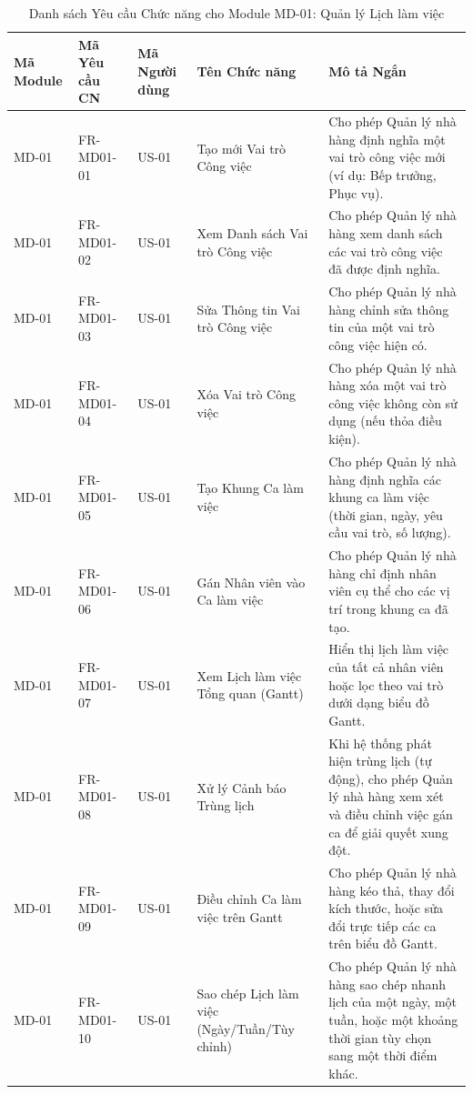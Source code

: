 \begin{longtable}{|m{2cm}|m{2.5cm}|m{2cm}|m{4cm}|m{4.5cm}|}
    \caption{Danh sách Yêu cầu Chức năng cho Module MD-01: Quản lý Lịch làm việc} \label{tab:fr_md01_revised} \\
    \hline
    \textbf{Mã Module} & \textbf{Mã Yêu cầu CN} & \textbf{Mã Người dùng} & \textbf{Tên Chức năng} & \textbf{Mô tả Ngắn} \\
    \hline
    \endhead
    
    \hline
    \endfoot
    
    \hline
    \endlastfoot
    
    MD-01 & FR-MD01-01 & US-01 & Tạo mới Vai trò Công việc & Cho phép Quản lý nhà hàng định nghĩa một vai trò công việc mới (ví dụ: Bếp trưởng, Phục vụ). \\
    \hline
    MD-01 & FR-MD01-02 & US-01 & Xem Danh sách Vai trò Công việc & Cho phép Quản lý nhà hàng xem danh sách các vai trò công việc đã được định nghĩa. \\
    \hline
    MD-01 & FR-MD01-03 & US-01 & Sửa Thông tin Vai trò Công việc & Cho phép Quản lý nhà hàng chỉnh sửa thông tin của một vai trò công việc hiện có. \\
    \hline
    MD-01 & FR-MD01-04 & US-01 & Xóa Vai trò Công việc & Cho phép Quản lý nhà hàng xóa một vai trò công việc không còn sử dụng (nếu thỏa điều kiện). \\
    \hline
    MD-01 & FR-MD01-05 & US-01 & Tạo Khung Ca làm việc & Cho phép Quản lý nhà hàng định nghĩa các khung ca làm việc (thời gian, ngày, yêu cầu vai trò, số lượng). \\
    \hline
    MD-01 & FR-MD01-06 & US-01 & Gán Nhân viên vào Ca làm việc & Cho phép Quản lý nhà hàng chỉ định nhân viên cụ thể cho các vị trí trong khung ca đã tạo. \\
    \hline
    MD-01 & FR-MD01-07 & US-01 & Xem Lịch làm việc Tổng quan (Gantt) & Hiển thị lịch làm việc của tất cả nhân viên hoặc lọc theo vai trò dưới dạng biểu đồ Gantt. \\
    \hline
    MD-01 & FR-MD01-08 & US-01 & Xử lý Cảnh báo Trùng lịch & Khi hệ thống phát hiện trùng lịch (tự động), cho phép Quản lý nhà hàng xem xét và điều chỉnh việc gán ca để giải quyết xung đột. \\
    \hline
    MD-01 & FR-MD01-09 & US-01 & Điều chỉnh Ca làm việc trên Gantt & Cho phép Quản lý nhà hàng kéo thả, thay đổi kích thước, hoặc sửa đổi trực tiếp các ca trên biểu đồ Gantt. \\
    \hline
    MD-01 & FR-MD01-10 & US-01 & Sao chép Lịch làm việc (Ngày/Tuần/Tùy chỉnh) & Cho phép Quản lý nhà hàng sao chép nhanh lịch của một ngày, một tuần, hoặc một khoảng thời gian tùy chọn sang một thời điểm khác. \\

\end{longtable}
